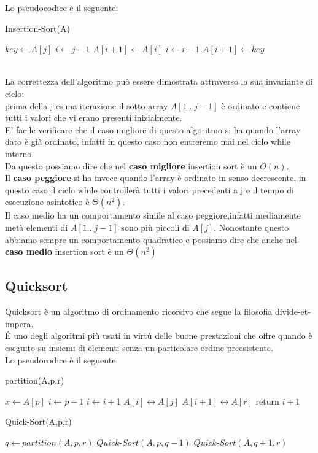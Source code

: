 \documentclass[]{article}
\begin{document}
Lo pseudocodice è il seguente:\\
\begin{algorithm}
\caption{Insertion-Sort(A)}
\begin{algorithmic}[1]
	\STATE $key \leftarrow A[j]$
	\STATE $i \leftarrow j - 1$
		\STATE	$A[i+1] \leftarrow A[i]$
		\STATE $ i \leftarrow i - 1$
	\ENDWHILE
	\STATE $ A[i+1] \leftarrow key$
\ENDFOR 
\end{algorithmic}
\end{algorithm}
\\
La correttezza dell'algoritmo può essere dimostrata attraverso la sua invariante di ciclo:\\ prima della j-esima iterazione il sotto-array $A[1 ... j-1]$ è ordinato e contiene tutti i valori che vi erano presenti inizialmente.\\
E' facile verificare che il caso migliore di questo algoritmo si ha quando l'array dato è già ordinato, infatti in questo caso non entreremo mai nel ciclo while interno.\\
Da questo possiamo dire che nel \textbf{caso migliore} insertion sort è un $\Theta(n)$.\\
Il \textbf{caso peggiore} si ha invece quando l'array è ordinato in senso decrescente, in questo caso il ciclo while controllerà tutti i valori precedenti a j e il tempo di esecuzione asintotico è $\Theta(n^2)$.\\
Il caso medio ha un comportamento simile al caso peggiore,infatti mediamente metà elementi di $A[1 ... j-1]$ sono più piccoli di $A[j]$. Nonostante questo abbiamo sempre un comportamento quadratico e possiamo dire che anche nel \textbf{caso medio} insertion sort è un $\Theta(n^2)$
\subsection{Quicksort}
Quicksort è un algoritmo di ordinamento ricorsivo che segue la filosofia divide-et-impera.\\
\'E uno degli algoritmi più usati in virtù delle buone prestazioni che offre quando è eseguito su insiemi di elementi senza un particolare ordine preesistente.\\
Lo pseudocodice è il seguente:

\begin{algorithm}
\caption{partition(A,p,r)}
\begin{algorithmic}[1]
\STATE $x \leftarrow A[p]$
\STATE $i \leftarrow p-1$
		\STATE $i \leftarrow i + 1$
		\STATE $A[i] \leftrightarrow A[j]$
	\ENDIF
\ENDFOR
\STATE $A[i+1] \leftrightarrow A[r]$
\STATE return $i+1$
\end{algorithmic}
\end{algorithm}
\newpage
\begin{algorithm}
\caption{Quick-Sort(A,p,r)}
\begin{algorithmic}[1]
	\STATE $q \leftarrow partition(A,p,r)$
	\STATE $Quick\mbox{-}Sort(A,p,q-1)$
	\STATE $Quick\mbox{-}Sort(A,q+1,r)$
\ENDIF
\end{algorithmic}
\end{algorithm}
\end{document}
